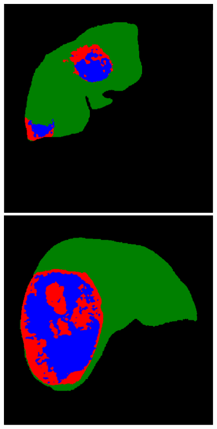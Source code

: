 \begin{figure}[!ht]
\begin{minipage}{4cm}
\end{minipage} 
\vspace{-0.2cm}
\begin{minipage}{4cm}
\includegraphics[width=\linewidth]{../SemanticSeg/images/1_21_FullDMP_resized}
\end{minipage} \hspace{-0.3cm}
\begin{minipage}{4cm}
\includegraphics[width=\linewidth]{../SemanticSeg/images/5_2_FullDMP_resized}

\end{minipage}
\end{figure}

